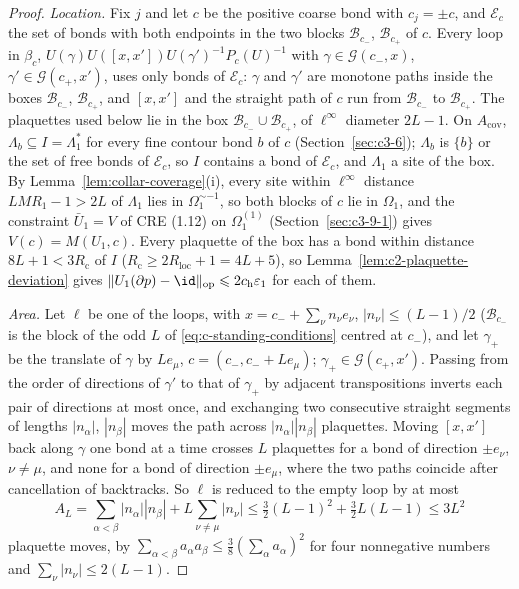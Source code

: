 \begin{proof}
\emph{Location.} Fix $j$ and let $c$ be the positive coarse bond with $c_j=\pm c$, and $\mathcal E_c$ the set of bonds with both endpoints in the two blocks $\mathcal B_{c_-}$, $\mathcal B_{c_+}$ of $c$. Every loop in $\beta_c$, $U(\gamma)U([x,x'])U(\gamma')^{-1}P_c(U)^{-1}$ with $\gamma\in\mathcal G(c_-,x)$, $\gamma'\in\mathcal G(c_+,x')$, uses only bonds of $\mathcal E_c$: $\gamma$ and $\gamma'$ are monotone paths inside the boxes $\mathcal B_{c_-}$, $\mathcal B_{c_+}$, and $[x,x']$ and the straight path of $c$ run from $\mathcal B_{c_-}$ to $\mathcal B_{c_+}$. The plaquettes used below lie in the box $\mathcal B_{c_-}\cup\mathcal B_{c_+}$, of $\ell^{\infty}$ diameter $2L-1$. On $A_{\mathrm{cov}}$, $\Lambda_b\subseteq I=\Lambda_1^*$ for every fine contour bond $b$ of $c$ (Section~\ref{sec:c3-6}); $\Lambda_b$ is $\{b\}$ or the set of free bonds of $\mathcal E_c$, so $I$ contains a bond of $\mathcal E_c$, and $\Lambda_1$ a site of the box. By Lemma~\ref{lem:collar-coverage}(i), every site within $\ell^{\infty}$ distance $LMR_1-1>2L$ of $\Lambda_1$ lies in $\Omega_1^{\sim-1}$, so both blocks of $c$ lie in $\Omega_1$, and the constraint $\bar U_1= V$ of CRE (1.12) on $\Omega_1^{(1)}$ (Section~\ref{sec:c3-9-1}) gives $V(c)= M(U_1,c)$. Every plaquette of the box has a bond within distance $8L+1<3R_{\mathrm c}$ of $I$ ($R_{\mathrm c}\geqslant 2R_{\mathrm{loc}}+1= 4L+5$), so Lemma~\ref{lem:c2-plaquette-deviation} gives $\|U_1(\partial p)-\id\|_{\mathrm{op}}\leqslant 2c_{\mathrm h}\varepsilon_1$ for each of them.

\emph{Area.} Let $\ell$ be one of the loops, with $x= c_-+\sum_{\nu}n_{\nu}e_{\nu}$, $|n_{\nu}|\leqslant(L-1)/2$ ($\mathcal B_{c_-}$ is the block of the odd $L$ of \eqref{eq:c-standing-conditions} centred at $c_-$), and let $\gamma_+$ be the translate of $\gamma$ by $Le_{\mu}$, $c=(c_-,c_-+Le_{\mu})$; $\gamma_+\in\mathcal G(c_+,x')$. Passing from the order of directions of $\gamma'$ to that of $\gamma_+$ by adjacent transpositions inverts each pair of directions at most once, and exchanging two consecutive straight segments of lengths $|n_{\alpha}|$, $|n_{\beta}|$ moves the path across $|n_{\alpha}||n_{\beta}|$ plaquettes. Moving $[x,x']$ back along $\gamma$ one bond at a time crosses $L$ plaquettes for a bond of direction $\pm e_{\nu}$, $\nu\neq\mu$, and none for a bond of direction $\pm e_{\mu}$, where the two paths coincide after cancellation of backtracks. So $\ell$ is reduced to the empty loop by at most
\begin{equation*}
    A_L= \sum_{\alpha<\beta}|n_{\alpha}||n_{\beta}|+L\sum_{\nu\neq\mu}|n_{\nu}|\leqslant \tfrac32(L-1)^2+\tfrac32L(L-1)\leqslant 3L^2
\end{equation*}
plaquette moves, by $\sum_{\alpha<\beta}a_{\alpha}a_{\beta}\leqslant\frac38(\sum_{\alpha}a_{\alpha})^2$ for four nonnegative numbers and $\sum_{\nu}|n_{\nu}|\leqslant 2(L-1)$.


\end{proof}
